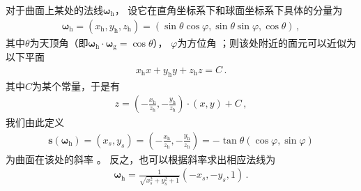 对于曲面上某处的法线${\bm\omega}_{\mathrm{h}}$，
设它在直角坐标系下和球面坐标系下具体的分量为
\begin{align}
    {\bm\omega}_{\mathrm{h}}=(x_{\mathrm{h}},y_{\mathrm{h}},z_{\mathrm{h}})
    =(\sin\theta\cos\varphi,\sin\theta\sin\varphi,\cos\theta)\, ,
\end{align}
其中$\theta$为天顶角（即${\bm\omega}_{\mathrm{h}}\cdot{\bm\omega}_{\mathrm{g}}=\cos\theta$），
$\varphi$为方位角
；则该处附近的面元可以近似为以下平面
\begin{align}
    x_{\mathrm{h}}x+y_{\mathrm{h}}y+z_{\mathrm{h}}z=C\, .
\end{align}
其中$C$为某个常量，于是有
\begin{align}
    z=\left(-\frac{x_{\mathrm{h}}}{z_{\mathrm{h}}},
    -\frac{y_{\mathrm{h}}}{z_{\mathrm{h}}}\right)\cdot(x,y)+C\, ,
\end{align}
我们由此定义
\begin{align}\label{eq:08-ex01-slope-of-surface}
    {\bm s}({\bm\omega}_{\mathrm{h}})=(x_s,y_s)
    =\left(-\frac{x_{\mathrm{h}}}{z_{\mathrm{h}}},
    -\frac{y_{\mathrm{h}}}{z_{\mathrm{h}}}\right)
    =-\tan\theta(\cos\varphi,\sin\varphi)
\end{align}
为曲面在该处的斜率
。
反之，也可以根据斜率求出相应法线为
\begin{align}\label{eq:08-ex01-normals-by-slope}
    {\bm\omega}_{\mathrm{h}}=\frac{1}{\sqrt{x_s^2+y_s^2+1}}(-x_s,-y_s,1)\, .
\end{align}


